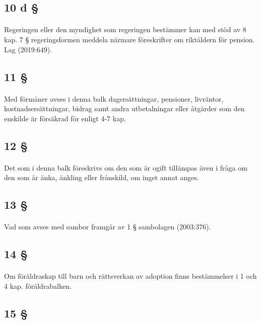 \documentclass[a4paper,notitlepage,openany,10pt]{book}
\begin{document}
\subsection*{10 d §}
\paragraph*{}
Regeringen eller den myndighet som regeringen bestämmer kan med stöd av 8 kap. 7 § regeringsformen meddela närmare föreskrifter om riktåldern för pension.
Lag (2019:649).
\subsection*{11 §}
\paragraph*{}
Med förmåner avses i denna balk dagersättningar, pensioner, livräntor, kostnadsersättningar, bidrag samt andra utbetalningar eller åtgärder som den enskilde är försäkrad för enligt 4-7 kap.
\subsection*{12 §}
\paragraph*{}
Det som i denna balk föreskrivs om den som är ogift tillämpas även i fråga om den som är änka, änkling eller frånskild, om inget annat anges.
\subsection*{13 §}
\paragraph*{}
Vad som avses med sambor framgår av 1 § sambolagen (2003:376).
\subsection*{14 §}
\paragraph*{}
Om föräldraskap till barn och rättsverkan av adoption finns bestämmelser i 1 och 4 kap. föräldrabalken.
\subsection*{15 §}
\end{document}
